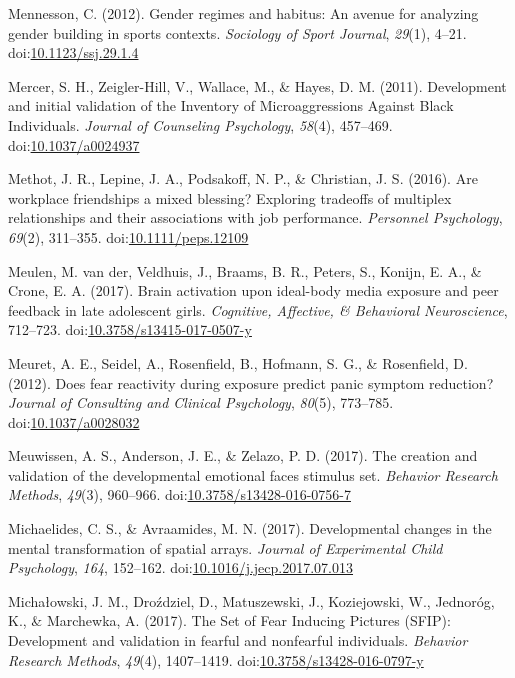 \documentclass[english,man]{apa6}
\theoremstyle{definition}
\theoremstyle{definition}
\theoremstyle{definition}
\theoremstyle{remark}
\begin{document}
\hypertarget{ref-Mennesson2012}{}
Mennesson, C. (2012). Gender regimes and habitus: An avenue for
analyzing gender building in sports contexts. \emph{Sociology of Sport
Journal}, \emph{29}(1), 4--21.
doi:\href{https://doi.org/10.1123/ssj.29.1.4}{10.1123/ssj.29.1.4}

\hypertarget{ref-Mercer2011}{}
Mercer, S. H., Zeigler-Hill, V., Wallace, M., \& Hayes, D. M. (2011).
Development and initial validation of the Inventory of Microaggressions
Against Black Individuals. \emph{Journal of Counseling Psychology},
\emph{58}(4), 457--469.
doi:\href{https://doi.org/10.1037/a0024937}{10.1037/a0024937}

\hypertarget{ref-Methot2016}{}
Methot, J. R., Lepine, J. A., Podsakoff, N. P., \& Christian, J. S.
(2016). Are workplace friendships a mixed blessing? Exploring tradeoffs
of multiplex relationships and their associations with job performance.
\emph{Personnel Psychology}, \emph{69}(2), 311--355.
doi:\href{https://doi.org/10.1111/peps.12109}{10.1111/peps.12109}

\hypertarget{ref-VanderMeulen2017}{}
Meulen, M. van der, Veldhuis, J., Braams, B. R., Peters, S., Konijn, E.
A., \& Crone, E. A. (2017). Brain activation upon ideal-body media
exposure and peer feedback in late adolescent girls. \emph{Cognitive,
Affective, \& Behavioral Neuroscience}, 712--723.
doi:\href{https://doi.org/10.3758/s13415-017-0507-y}{10.3758/s13415-017-0507-y}

\hypertarget{ref-Meuret2012}{}
Meuret, A. E., Seidel, A., Rosenfield, B., Hofmann, S. G., \&
Rosenfield, D. (2012). Does fear reactivity during exposure predict
panic symptom reduction? \emph{Journal of Consulting and Clinical
Psychology}, \emph{80}(5), 773--785.
doi:\href{https://doi.org/10.1037/a0028032}{10.1037/a0028032}

\hypertarget{ref-Meuwissen2017}{}
Meuwissen, A. S., Anderson, J. E., \& Zelazo, P. D. (2017). The creation
and validation of the developmental emotional faces stimulus set.
\emph{Behavior Research Methods}, \emph{49}(3), 960--966.
doi:\href{https://doi.org/10.3758/s13428-016-0756-7}{10.3758/s13428-016-0756-7}

\hypertarget{ref-Michaelides2017}{}
Michaelides, C. S., \& Avraamides, M. N. (2017). Developmental changes
in the mental transformation of spatial arrays. \emph{Journal of
Experimental Child Psychology}, \emph{164}, 152--162.
doi:\href{https://doi.org/10.1016/j.jecp.2017.07.013}{10.1016/j.jecp.2017.07.013}

\hypertarget{ref-Michaowski2016}{}
Michałowski, J. M., Droździel, D., Matuszewski, J., Koziejowski, W.,
Jednoróg, K., \& Marchewka, A. (2017). The Set of Fear Inducing Pictures
(SFIP): Development and validation in fearful and nonfearful
individuals. \emph{Behavior Research Methods}, \emph{49}(4), 1407--1419.
doi:\href{https://doi.org/10.3758/s13428-016-0797-y}{10.3758/s13428-016-0797-y}
\end{document}
